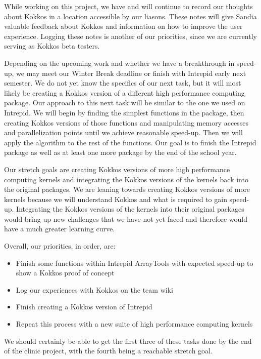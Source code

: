 \documentclass[midyear]{hmcclinic}
\begin{document}
While working on this project, we have and will continue to record our thoughts
about Kokkos in a location accessible by our liasons.  These notes will give
Sandia valuable feedback about Kokkos and information on how to improve the user
experience. Logging these notes is another of our priorities, since we are
currently serving as Kokkos beta testers. 

Depending on the upcoming work and whether we have a breakthrough in speed-up,
we may meet our Winter Break deadline or finish with Intrepid early next
semester. We do not yet know the specifics of our next task, but it will most
likely be creating a Kokkos version of a different high performance computing
package.  Our approach to this next task will be similar to the one we used on
Intrepid. We will begin by finding the simplest functions in the package, then
creating Kokkos versions of those functions and manipulating memory accesses and
parallelization points until we achieve reasonable speed-up. Then we will apply
the algorithm to the rest of the functions. Our goal is to finish the Intrepid
package as well as at least one more package by the end of the school year. 

Our stretch goals are creating Kokkos versions of more high performance
computing kernels and integrating the Kokkos versions of the kernels back into
the original packages. We are leaning towards creating Kokkos versions of more
kernels because we will understand Kokkos and what is required to gain speed-up.
Integrating the Kokkos versions of the kernels into their original packages
would bring up new challenges that we have not yet faced and therefore would
have a much greater learning curve. 

Overall, our priorities, in order, are: 
\begin{itemize}
        \item Finish some functions within Intrepid ArrayTools with expected
            speed-up to show a Kokkos proof of concept
	
	\item Log our experiences with Kokkos on the team wiki
	
	\item Finish creating a Kokkos version of Intrepid
	
        \item Repeat this process with a new suite of high performance computing
            kernels
\end{itemize}
We should certainly be able to get the first three of these tasks done by the
end of the clinic project, with the fourth being a reachable stretch goal.
\end{document}
